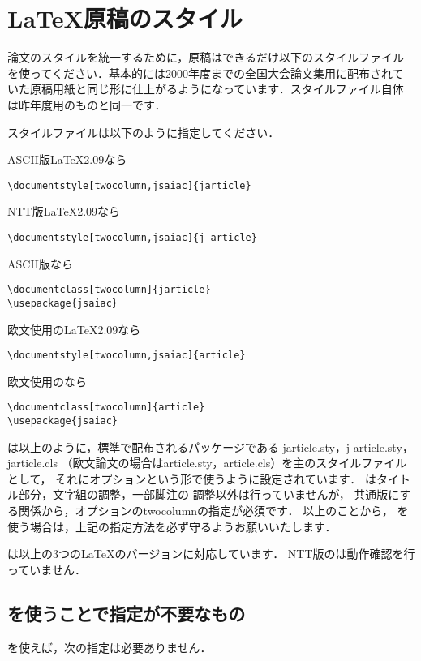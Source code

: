 \section{\LaTeX{}原稿のスタイル}
論文のスタイルを統一するために，原稿はできるだけ以下のスタイルファイル
を使ってください．基本的には2000年度までの全国大会論文集用に配布されて
いた原稿用紙と同じ形に仕上がるようになっています．スタイルファイル自体
は昨年度用のものと同一です．

スタイルファイルは以下のように指定してください．

ASCII版\LaTeX{}2.09なら
\begin{verbatim}
\documentstyle[twocolumn,jsaiac]{jarticle}
\end{verbatim}

NTT版\LaTeX{}2.09なら
\begin{verbatim}
\documentstyle[twocolumn,jsaiac]{j-article}
\end{verbatim}

ASCII版\LaTeXe{}なら
\begin{verbatim}
\documentclass[twocolumn]{jarticle}
\usepackage{jsaiac}
\end{verbatim}

欧文使用の\LaTeX{}2.09なら
\begin{verbatim}
\documentstyle[twocolumn,jsaiac]{article}
\end{verbatim}

欧文使用の\LaTeXe{}なら
\begin{verbatim}
\documentclass[twocolumn]{article}
\usepackage{jsaiac}
\end{verbatim}

\Style{}は以上のように，標準で配布されるパッケージである
jarticle.sty，j-article.sty，jarticle.cls
（欧文論文の場合はarticle.sty，article.cls）を主のスタイルファイルとして，
それにオプションという形で使うように設定されています．
\Style{}はタイトル部分，文字組の調整，一部脚注の
調整以外は行っていませんが，
共通版にする関係から，オプションのtwocolumnの指定が必須です．
以上のことから，
\Style{}を使う場合は，上記の指定方法を必ず守るようお願いいたします．

\Style{}は以上の3つの\LaTeX{}のバージョンに対応しています．
NTT版の\LaTeXe{}は動作確認を行っていません．

\subsection{\Style{}を使うことで指定が不要なもの}

\Style{}を使えば，次の指定は必要ありません．

